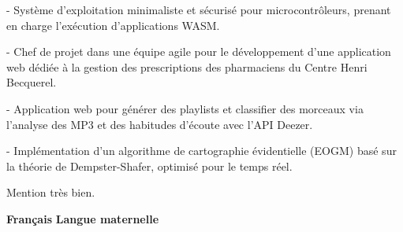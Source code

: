 \documentclass[10pt,a4paper,ragged2e,withhyper]{../AltaCV/altacv}
\begin{document}
\begin{paracol}{2}

  \begin{minipage}[t]{0.49\linewidth}
    {\small {} - Système d'exploitation minimaliste et sécurisé pour microcontrôleurs, prenant en charge l’exécution d’applications WASM.}

    \divider

    {\small {} - Chef de projet dans une équipe agile pour le développement d'une application web dédiée à la gestion des prescriptions des pharmaciens du Centre Henri Becquerel.}
  \end{minipage}
  \hfill
  \begin{minipage}[t]{0.49\linewidth}
    {\small {} - Application web pour générer des playlists et classifier des morceaux via l’analyse des MP3 et des habitudes d’écoute avec l’API Deezer.}

    \divider

    {\small {} - Implémentation d’un algorithme de cartographie évidentielle (EOGM) basé sur la théorie de Dempster-Shafer, optimisé pour le temps réel.}
  \end{minipage}

  \medskip

  \switchcolumn



  \divider

  Mention très bien.

  \divider



  \textcolor{emphasis}{\textbf{Français}} \hfill \textbf{Langue maternelle}\\


\end{paracol}
\end{document}
